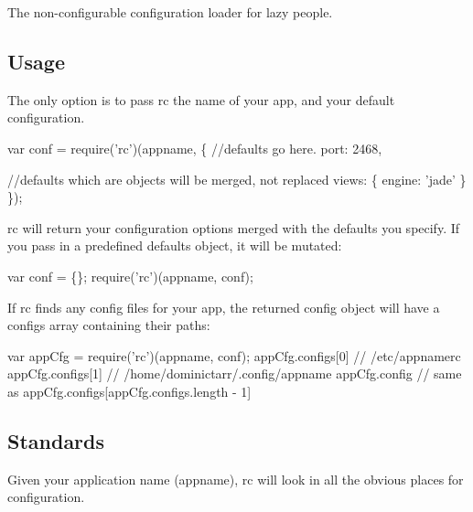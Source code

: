 The non-\/configurable configuration loader for lazy people.

\subsection*{Usage}

The only option is to pass rc the name of your app, and your default configuration.


\begin{DoxyCode}
var conf = require('rc')(appname, \{
  //defaults go here.
  port: 2468,

  //defaults which are objects will be merged, not replaced
  views: \{
    engine: 'jade'
  \}
\});
\end{DoxyCode}


{\ttfamily rc} will return your configuration options merged with the defaults you specify. If you pass in a predefined defaults object, it will be mutated\+:


\begin{DoxyCode}
var conf = \{\};
require('rc')(appname, conf);
\end{DoxyCode}


If {\ttfamily rc} finds any config files for your app, the returned config object will have a {\ttfamily configs} array containing their paths\+:


\begin{DoxyCode}
var appCfg = require('rc')(appname, conf);
appCfg.configs[0] // /etc/appnamerc
appCfg.configs[1] // /home/dominictarr/.config/appname
appCfg.config // same as appCfg.configs[appCfg.configs.length - 1]
\end{DoxyCode}


\subsection*{Standards}

Given your application name ({\ttfamily appname}), rc will look in all the obvious places for configuration.


